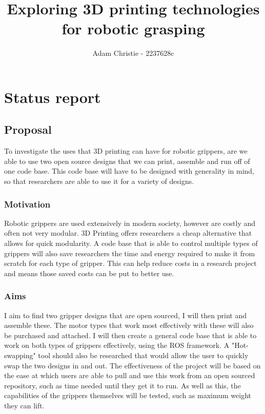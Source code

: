 \documentclass[11pt]{article}
\title{Exploring 3D printing technologies for robotic grasping}
\author{Adam Christie - 2237628c}
\begin{document}
    \maketitle
    
    
     

\section{Status report}

\subsection{Proposal}\label{proposal}
To investigate the uses that 3D printing can have for robotic grippers, are we able to use two open source designs that we can print, assemble and run off of one code base. This code base will have to be designed with generality in mind, so that researchers are able to use it for a variety of designs. 

\subsubsection{Motivation}\label{motivation}
Robotic grippers are used extensively in modern society, however are costly and often not very modular. 3D Printing offers researchers a cheap alternative that allows for quick modularity. A code base that is able to control multiple types of grippers will also save researchers the time and energy required to make it from scratch for each type of gripper. This can help reduce costs in a research project and means those saved costs can be put to better use. 


\subsubsection{Aims}\label{aims}
I aim to find two gripper designs that are open sourced, I will then print and assemble these. The motor types that work most effectively with these will also be purchased and attached. I will then create a general code base that is able to work on both types of grippers effectively, using the ROS framework. A "Hot-swapping" tool should also be researched that would allow the user to quickly swap the two designs in and out. The effectiveness of the project will be based on the ease at which users are able to pull and use this work from an open sourced repository, such as time needed until they get it to run. As well as this, the capabilities of the grippers themselves will be tested, such as maximum weight they can lift. 
\end{document}
